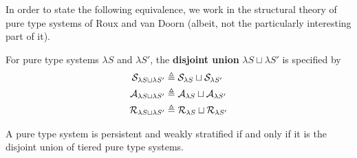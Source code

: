 \documentclass{article}
\begin{document}
In order to state the following equivalence, we work in the structural theory of pure type systems of Roux and van Doorn \cite{roux-doorn-2014} (albeit, not the particularly interesting part of it).

\begin{definition}
For pure type systems $\lambda S$ and $\lambda S'$, the \textbf{disjoint union} $\lambda S \sqcup \lambda S'$ is specified by
\begin{align*}
    \mathcal S _{\lambda S \sqcup \lambda S'} &\triangleq \mathcal S _{\lambda S} \sqcup \mathcal S_{\lambda S'} \\
    \mathcal A_{\lambda S \sqcup \lambda S'} &\triangleq \mathcal A_{\lambda S} \sqcup \mathcal A_{\lambda S'} \\
    \mathcal R _{\lambda S \sqcup \lambda S'} &\triangleq \mathcal R _{\lambda S} \sqcup \mathcal R_{\lambda S'}
\end{align*}
\end{definition}

\begin{lemma}
A pure type system is persistent and weakly stratified if and only if it is the disjoint union of tiered pure type systems.
\end{lemma}
\end{document}
